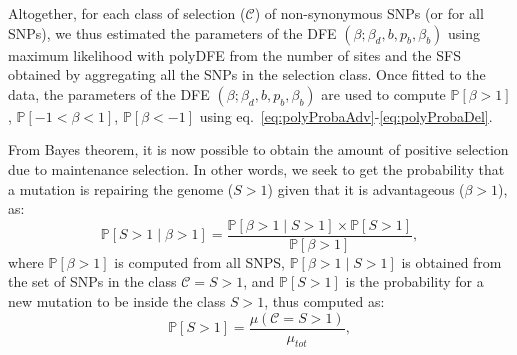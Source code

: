\documentclass{article}
\newcommand{\proba}{\mathbb{P}}
\newcommand{\Sphy}{S}
\newcommand{\Sphyclass}{\mathcal{C}}
\newcommand{\divAdv}{ \Sphy > 1}
\newcommand{\given}{\mid}
\newcommand{\Spop}{\beta}
\newcommand{\polyDel}{\Spop < -1}
\newcommand{\polyNeutral}{-1 < \Spop < 1}
\newcommand{\polyAdv}{ \Spop > 1}
\newcommand{\PpolyDel}{\proba \left[ \polyDel \right]}
\newcommand{\PpolyNeutral}{\proba \left[ \polyNeutral \right]}
\newcommand{\PpolyAdv}{\proba \left[ \polyAdv \right]}
\begin{document}
    Altogether, for each class of selection ($\Sphyclass$) of non-synonymous SNPs (or for all SNPs), we thus estimated the parameters of the DFE $\left( \Spop; \Spop_d , b, p_b, \Spop_b \right)$ using maximum likelihood with polyDFE from the number of sites and the SFS obtained by aggregating all the SNPs in the selection class.
    Once fitted to the data, the parameters of the DFE $\left( \Spop; \Spop_d , b, p_b, \Spop_b \right)$ are used to compute $\PpolyAdv$, $\PpolyNeutral$, $\PpolyDel$ using eq.~\ref{eq:polyProbaAdv}-\ref{eq:polyProbaDel}.

    From Bayes theorem, it is now possible to obtain the amount of positive selection due to maintenance selection.
    In other words, we seek to get the probability that a mutation is repairing the genome ($\divAdv$) given that it is advantageous ($\polyAdv$), as:
    \begin{equation}
        \proba \left[\divAdv \given \polyAdv\right] = \frac{\proba \left[\polyAdv \given \divAdv\right] \times \proba\left[\divAdv\right]}{\PpolyAdv},
        \label{eq:bayes}
    \end{equation}
    where $\PpolyAdv$ is computed from all SNPS, $\proba \left[\polyAdv \given \divAdv\right]$ is obtained from the set of SNPs in the class $\Sphyclass = \divAdv$, and $\proba\left[\divAdv\right]$ is the probability for a new mutation to be inside the class $\divAdv$, thus computed as:
    \begin{equation}
        \proba\left[\divAdv\right] = \frac{\mu\left( \Sphyclass = \divAdv \right)}{\mu_{tot}},
        \label{eq:proba-dfe-mutsel}
    \end{equation}
\end{document}
